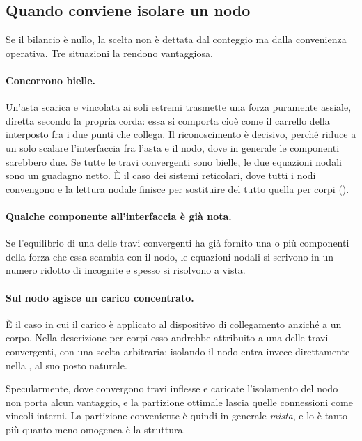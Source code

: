 \subsection{Quando conviene isolare un nodo}
\label{subsec:conviene_nodo}

Se il bilancio è nullo, la scelta non è dettata dal
conteggio ma dalla convenienza operativa. Tre situazioni la
rendono vantaggiosa.

\paragraph{Concorrono bielle.}
Un'asta scarica e vincolata ai soli estremi trasmette una
forza puramente assiale, diretta secondo la propria corda:
essa si comporta cioè come il carrello della
 interposto fra i due punti che
collega. Il riconoscimento è decisivo, perché riduce a un
solo scalare l'interfaccia fra l'asta e il nodo, dove in
generale le componenti sarebbero due. Se tutte le travi
convergenti sono bielle, le due equazioni nodali sono un
guadagno netto. È il caso dei sistemi reticolari, dove tutti
i nodi convengono e la lettura nodale finisce per sostituire
del tutto quella per corpi ().

\paragraph{Qualche componente all'interfaccia è già nota.}
Se l'equilibrio di una delle travi convergenti ha già
fornito una o più componenti della forza che essa scambia
con il nodo, le equazioni nodali si scrivono in un numero
ridotto di incognite e spesso si risolvono a vista.

\paragraph{Sul nodo agisce un carico concentrato.}
È il caso in cui il carico è applicato al dispositivo di
collegamento anziché a un corpo. Nella descrizione per
corpi esso andrebbe attribuito a una delle travi
convergenti, con una scelta arbitraria; isolando il nodo
entra invece direttamente nella
, al suo posto naturale.

Specularmente, dove convergono travi inflesse e caricate
l'isolamento del nodo non porta alcun vantaggio, e la
partizione ottimale lascia quelle connessioni come vincoli
interni. La partizione conveniente è quindi in generale
\emph{mista}, e lo è tanto più quanto meno omogenea è la
struttura.

